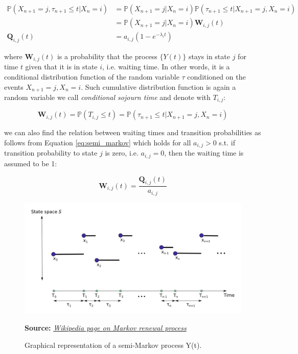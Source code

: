 \begin{align}
    \mathbb{P}(X_{n+1}=j, \tau_{n+1} \leq t|X_n=i) &= \mathbb{P}(X_{n+1}=j|X_n=i) \mathbb{P}(\tau_{n+1} \leq t|X_{n+1}=j, X_n=i) \\ 
                                                   &= \mathbb{P}(X_{n+1}=j|X_n=i) \textbf{W}_{i,j}(t) \\
                            \textbf{Q}_{i,j}(t)    &= a_{i,j} (1-e^{- \lambda_i t})
\end{align}

where $\textbf{W}_{i,j}(t)$ is a probability that the process $\{Y(t)\}$ stays in state $j$ for time $t$ given that it is in state $i$, i.e. waiting time. In other words, it is a conditional distribution function 
of the random variable $\tau$ conditioned on the events $X_{n+1}=j, X_n=i$. Such cumulative distribution function is again a random variable we call \textit{conditional sojourn time} and denote with $T_{i,j}$:

\begin{equation}
    \textbf{W}_{i,j}(t) = \mathbb{P}(T_{i,j} \leq t) = \mathbb{P}(\tau_{n+1} \leq t|X_{n+1}=j, X_n=i) 
\end{equation}

we can also find the relation between waiting times and transition probabilities as follows from Equation \ref{eq:semi_markov} which holds for all $a_{i,j} > 0$ s.t. if transition probability to state $j$ is zero, 
i.e. $a_{i,j} = 0$, then the waiting time is assumed to be 1:

\begin{equation} \label{eq:semi_markov}
    \textbf{W}_{i,j}(t) = \frac{\textbf{Q}_{i,j}(t)}{a_{i,j}}
\end{equation}

\begin{figure}[htbp]
    \begin{center}
        \includegraphics[width=1.0\textwidth]{Figs/semi_markov.png}
        \caption*{\textbf{Source:} \href{https://en.wikipedia.org/wiki/Markov_renewal_process}{\textit{Wikipedia page on Markov renewal process}}}
        \caption[Diagram representation semi-Markov process]{Graphical representation of a semi-Markov process Y(t).}
        \label{fig:semi_markov}
    \end{center}
\end{figure}

